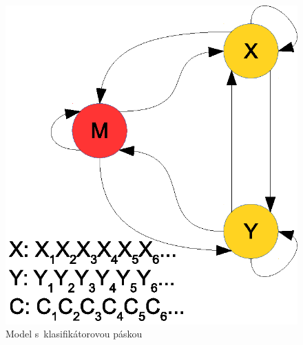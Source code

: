 \documentclass[myposter,portrait]{sciposter}
\begin{document}
\begin{multicols*}{3}
\begin{figure}[htp]
        \centering
        \includegraphics[width=.5\textwidth, clip=true]{images/model_clf_paska}
        \caption{Model s~klasifikátorovou páskou}
        \label{fig:model-clf-tape}
\end{figure}





\end{multicols*}
\end{document}
